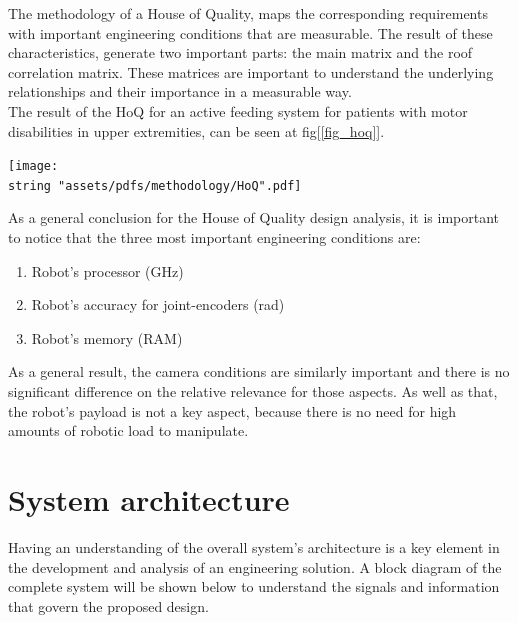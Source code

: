 \documentclass[11pt]{report} %
\begin{document}
The methodology of a House of Quality, maps the corresponding requirements with important engineering conditions that are measurable. The result of these characteristics, generate two important parts: the main matrix and the roof correlation matrix. These matrices are important to understand the underlying relationships and their importance in a measurable way.\\

The result of the HoQ for an active feeding system for patients with motor disabilities in upper extremities, can be seen at fig[\ref{fig_hoq}].\\

\begin{center}
    \texttt{[image: \\string "assets/pdfs/methodology/HoQ".pdf]}
    \bigbreak
    \begin{minipage}{\linewidth} %
    \label{fig_hoq}
\end{minipage} \end{center}

As a general conclusion for the House of Quality design analysis, it is important to notice that the three most important engineering conditions are:\\

\begin{enumerate}
    \item Robot's processor (GHz)
    \item Robot's accuracy for joint-encoders (rad)
    \item Robot's memory (RAM)
\end{enumerate}

As a general result, the camera conditions are similarly important and there is no significant difference on the relative relevance for those aspects. As well as that, the robot's payload is not a key aspect, because there is no need for high amounts of robotic load to manipulate.\\


\section{System architecture}

Having an understanding of the overall system's architecture is a key element in the development and analysis of an engineering solution. A block diagram of the complete system will be shown below to understand the signals and information that govern the proposed design.
\end{document}
